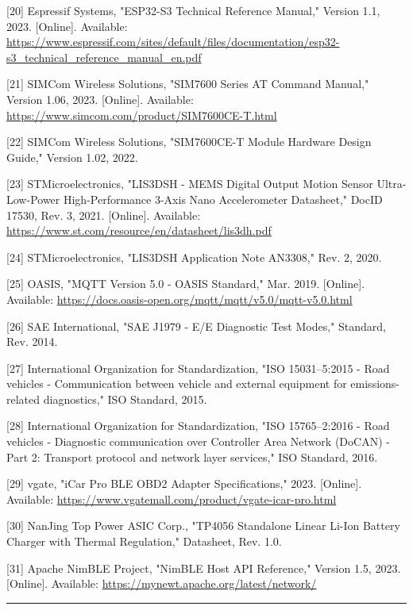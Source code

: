 \documentclass[a4paper]{extarticle}
\begin{document}
{[}20{]} Espressif Systems, "ESP32-S3 Technical Reference Manual,"
Version 1.1, 2023. {[}Online{]}. Available:
\url{https://www.espressif.com/sites/default/files/documentation/esp32-s3_technical_reference_manual_en.pdf}

{[}21{]} SIMCom Wireless Solutions, "SIM7600 Series AT Command Manual,"
Version 1.06, 2023. {[}Online{]}. Available:
\url{https://www.simcom.com/product/SIM7600CE-T.html}

{[}22{]} SIMCom Wireless Solutions, "SIM7600CE-T Module Hardware Design
Guide," Version 1.02, 2022.

{[}23{]} STMicroelectronics, "LIS3DSH - MEMS Digital Output Motion
Sensor Ultra-Low-Power High-Performance 3-Axis
\textquotesingle Nano\textquotesingle{} Accelerometer Datasheet," DocID
17530, Rev. 3, 2021. {[}Online{]}. Available:
\url{https://www.st.com/resource/en/datasheet/lis3dh.pdf}

{[}24{]} STMicroelectronics, "LIS3DSH Application Note AN3308," Rev. 2,
2020.

{[}25{]} OASIS, "MQTT Version 5.0 - OASIS Standard," Mar. 2019.
{[}Online{]}. Available:
\url{https://docs.oasis-open.org/mqtt/mqtt/v5.0/mqtt-v5.0.html}

{[}26{]} SAE International, "SAE J1979 - E/E Diagnostic Test Modes,"
Standard, Rev. 2014.

{[}27{]} International Organization for Standardization, "ISO
15031--5:2015 - Road vehicles - Communication between vehicle and
external equipment for emissions-related diagnostics," ISO Standard,
2015.

{[}28{]} International Organization for Standardization, "ISO
15765--2:2016 - Road vehicles - Diagnostic communication over Controller
Area Network (DoCAN) - Part 2: Transport protocol and network layer
services," ISO Standard, 2016.

{[}29{]} vgate, "iCar Pro BLE OBD2 Adapter Specifications," 2023.
{[}Online{]}. Available:
\url{https://www.vgatemall.com/product/vgate-icar-pro.html}

{[}30{]} NanJing Top Power ASIC Corp., "TP4056 Standalone Linear Li-Ion
Battery Charger with Thermal Regulation," Datasheet, Rev. 1.0.

{[}31{]} Apache NimBLE Project, "NimBLE Host API Reference," Version
1.5, 2023. {[}Online{]}. Available:
\url{https://mynewt.apache.org/latest/network/}

\begin{center}\rule{0.5\linewidth}{0.5pt}\end{center}
\end{document}
